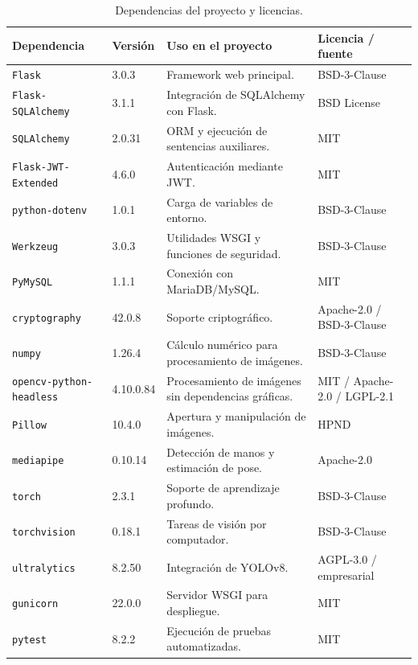 \begin{table}
	\centering
	\scriptsize
	\begin{tabular}{@{}p{3.1cm}p{1.5cm}p{5.3cm}p{3.5cm}@{}}
		\toprule
		\textbf{Dependencia} & \textbf{Versión} & \textbf{Uso en el proyecto} & \textbf{Licencia / fuente} \\
		\midrule
		\texttt{Flask} & 3.0.3 & Framework web principal. & BSD-3-Clause~\cite{pypi_flask} \\
		\texttt{Flask-SQLAlchemy} & 3.1.1 & Integración de SQLAlchemy con Flask. & BSD License~\cite{pypi_flask_sqlalchemy} \\
		\texttt{SQLAlchemy} & 2.0.31 & ORM y ejecución de sentencias auxiliares. & MIT~\cite{pypi_sqlalchemy} \\
		\texttt{Flask-JWT-Extended} & 4.6.0 & Autenticación mediante JWT. & MIT~\cite{pypi_flask_jwt_extended} \\
		\texttt{python-dotenv} & 1.0.1 & Carga de variables de entorno. & BSD-3-Clause~\cite{pypi_python_dotenv} \\
		\texttt{Werkzeug} & 3.0.3 & Utilidades WSGI y funciones de seguridad. & BSD-3-Clause~\cite{pypi_werkzeug} \\
		\texttt{PyMySQL} & 1.1.1 & Conexión con MariaDB/MySQL. & MIT~\cite{pypi_pymysql} \\
		\texttt{cryptography} & 42.0.8 & Soporte criptográfico. & Apache-2.0 / BSD-3-Clause~\cite{pypi_cryptography} \\
		\texttt{numpy} & 1.26.4 & Cálculo numérico para procesamiento de imágenes. & BSD-3-Clause~\cite{pypi_numpy} \\
		\texttt{opencv-python- headless} & 4.10.0.84 & Procesamiento de imágenes sin dependencias gráficas. & MIT / Apache-2.0 / LGPL-2.1~\cite{pypi_opencv_python_headless} \\
		\texttt{Pillow} & 10.4.0 & Apertura y manipulación de imágenes. & HPND~\cite{pypi_pillow} \\
		\texttt{mediapipe} & 0.10.14 & Detección de manos y estimación de pose. & Apache-2.0~\cite{pypi_mediapipe} \\
		\texttt{torch} & 2.3.1 & Soporte de aprendizaje profundo. & BSD-3-Clause~\cite{pypi_torch} \\
		\texttt{torchvision} & 0.18.1 & Tareas de visión por computador. & BSD-3-Clause~\cite{pypi_torchvision} \\
		\texttt{ultralytics} & 8.2.50 & Integración de YOLOv8. & AGPL-3.0 / empresarial~\cite{pypi_ultralytics,ultralytics_license} \\
		\texttt{gunicorn} & 22.0.0 & Servidor WSGI para despliegue. & MIT~\cite{pypi_gunicorn} \\
		\texttt{pytest} & 8.2.2 & Ejecución de pruebas automatizadas. & MIT~\cite{pypi_pytest} \\
		\bottomrule
	\end{tabular}
	\caption{Dependencias del proyecto y licencias.}
	\label{tabla:dependencias_licencias}
\end{table}

